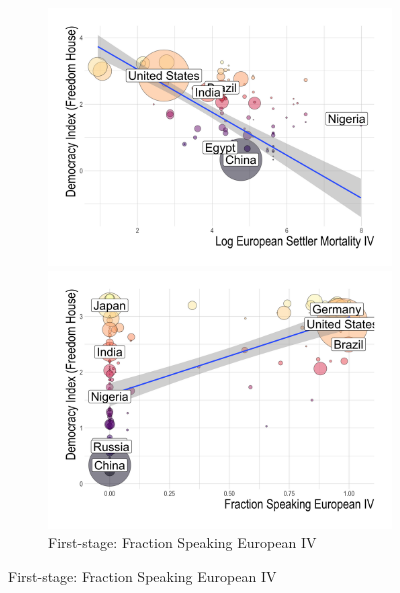 \begin{figure}[htb]
\centering
\caption{Causal Effects of Democracy}\label{fig:first-stage}
\captionsetup{width=0.8\textwidth}
\begin{subfigure}[c]{.49\linewidth}

    \centering
    \includegraphics[width=.99\textwidth]{plots/figure2a.png}
    \caption{First-stage: Log European Settler Mortality IV}\label{fig:first-stage-european-settlers}
    
    \includegraphics[width=.99\textwidth]{plots/figure2b.png}
    \caption{First-stage: Fraction Speaking European IV}\label{fig:first-stage-fraction-european}


\end{subfigure}
\end{figure}
